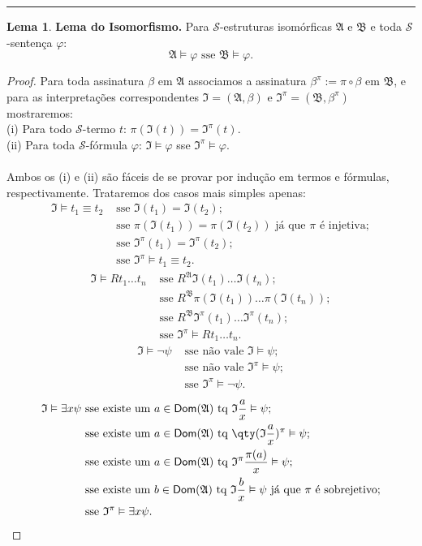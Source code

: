 \documentclass[11pt]{article}
\theoremstyle{definition}
\newtheorem{lemma}{Lema}
\newcommand{\mc}[1]{\mathcal{#1}}
\newcommand{\mf}[1]{\mathfrak{#1}}
\newcommand{\msf}[1]{\mathsf{#1}}
\begin{document}
\hrule

\begin{lemma}
\textbf{Lema do Isomorfismo.} Para $\mc{S}$-estruturas isomórficas $\mf{A}$ e $\mf{B}$ e toda $\mc{S}$-sentença $\varphi$:
\[
\mf{A}\vDash\varphi\text{ sse }\mf{B}\vDash\varphi.
\]

\begin{proof}
Para toda assinatura $\beta$ em $\mf{A}$ associamos a assinatura $\beta^\pi:=\pi\circ\beta$ em $\mf{B}$, e para as interpretações correspondentes $\mf{I}=(\mf{A},\beta)$ e $\mf{I}^\pi=(\mf{B},\beta^\pi)$ mostraremos:\\
(i) Para todo $\mc{S}$-termo $t$: $\pi(\mf{I}(t))=\mf{I}^\pi(t)$.\\
(ii) Para toda $\mc{S}$-fórmula $\varphi$: $\mf{I}\vDash\varphi$ sse $\mf{I}^\pi\vDash\varphi$.\\\\
Ambos os (i) e (ii) são fáceis de se provar por indução em termos e fórmulas, respectivamente. Trataremos dos casos mais simples apenas:\\
\begin{align*}
    \mf{I}\vDash t_1\equiv t_2 &\text{ sse }\mf{I}(t_1)=\mf{I}(t_2);\\
    &\text{ sse }\pi(\mf{I}(t_1))=\pi(\mf{I}(t_2))\text{ já que }\pi\text{ é injetiva};\\
    &\text{ sse }\mf{I}^\pi(t_1)=\mf{I}^\pi(t_2);\\
    &\text{ sse }\mf{I}^\pi\vDash t_1\equiv t_2.
\end{align*}
\begin{align*}
    \mf{I}\vDash Rt_1\dots t_n &\text{ sse }R^\mf{A}\mf{I}(t_1)\dots\mf{I}(t_n);\\
    &\text{ sse }R^\mf{B}\pi(\mf{I}(t_1))\dots\pi(\mf{I}(t_n));\\
    &\text{ sse }R^\mf{B}\mf{I}^\pi(t_1)\dots\mf{I}^\pi(t_n);\\
    &\text{ sse }\mf{I}^\pi\vDash Rt_1\dots t_n.
\end{align*}
\begin{align*}
    \mf{I}\vDash\neg\psi &\text{ sse não vale }\mf{I}\vDash\psi;\\
    &\text{ sse não vale }\mf{I}^\pi\vDash\psi;\\
    &\text{ sse }\mf{I}^\pi\vDash\neg\psi.
\end{align*}
\begin{align*}
    \mf{I}\vDash\exists x\psi &\text{ sse existe um }a\in\msf{Dom}(\mf{A})\text{ tq }\mf{I}\frac{a}{x}\vDash\psi;\\
    &\text{ sse existe um }a\in\msf{Dom}(\mf{A})\text{ tq }\qty(\mf{I}\frac{a}{x})^\pi\vDash\psi;\\
    &\text{ sse existe um }a\in\msf{Dom}(\mf{A})\text{ tq }\mf{I}^\pi\frac{\pi(a)}{x}\vDash\psi;\\
    &\text{ sse existe um }b\in\msf{Dom}(\mf{A})\text{ tq }\mf{I}\frac{b}{x}\vDash\psi\text{ já que }\pi\text{ é sobrejetivo};\\
    &\text{ sse }\mf{I}^\pi\vDash\exists x\psi.
\end{align*}
\end{proof}
\end{lemma}
\end{document}
